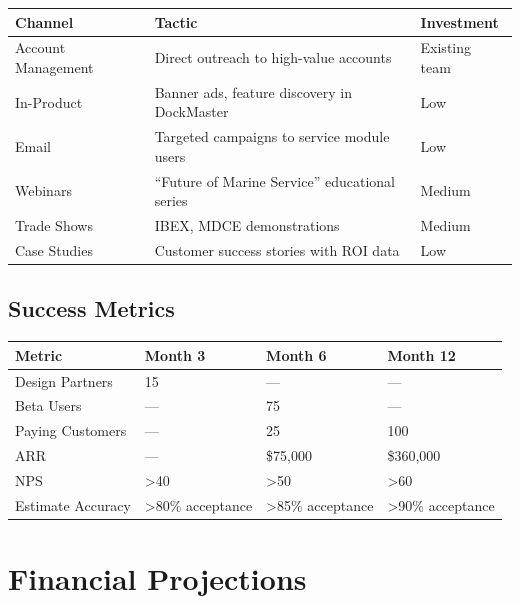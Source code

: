 \documentclass[11pt,a4paper]{article}
\begin{document}
\begin{table}[H]
\centering
\begin{tabularx}{\textwidth}{@{}L{3.5cm}L{7cm}L{3cm}@{}}
\toprule
\textbf{Channel} & \textbf{Tactic} & \textbf{Investment} \\
\midrule
Account Management & Direct outreach to high-value accounts & Existing team \\
In-Product & Banner ads, feature discovery in DockMaster & Low \\
Email & Targeted campaigns to service module users & Low \\
Webinars & ``Future of Marine Service'' educational series & Medium \\
Trade Shows & IBEX, MDCE demonstrations & Medium \\
Case Studies & Customer success stories with ROI data & Low \\
\bottomrule
\end{tabularx}
\end{table}

\subsection{Success Metrics}

\begin{table}[H]
\centering
\begin{tabularx}{\textwidth}{@{}L{4cm}C{3.5cm}C{3.5cm}C{3.5cm}@{}}
\toprule
\textbf{Metric} & \textbf{Month 3} & \textbf{Month 6} & \textbf{Month 12} \\
\midrule
Design Partners & 15 & --- & --- \\
Beta Users & --- & 75 & --- \\
Paying Customers & --- & 25 & 100 \\
ARR & --- & \$75,000 & \$360,000 \\
NPS & >40 & >50 & >60 \\
Estimate Accuracy & >80\% acceptance & >85\% acceptance & >90\% acceptance \\
\bottomrule
\end{tabularx}
\end{table}

\newpage
\section{Financial Projections}
\end{document}

